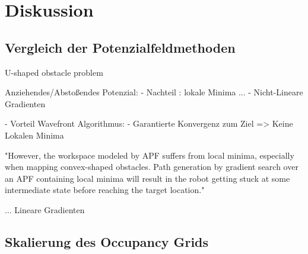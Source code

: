 \chapter{Diskussion}

\section{Vergleich der Potenzialfeldmethoden}

U-shaped obstacle problem \cite{yujiang.2017}

Anziehendes/Abstoßendes Potenzial:
	- Nachteil : lokale Minima
	...
	- Nicht-Lineare Gradienten


- Vorteil Wavefront Algorithmus: 
	- Garantierte Konvergenz zum Ziel => Keine Lokalen Minima

"However, the workspace modeled by APF suffers from local minima, especially when mapping convex-shaped obstacles. Path generation by gradient search over an APF containing local minima will result in the robot getting stuck at some intermediate state before reaching the target location." \cite{maqbool.2021}

	...
	Lineare Gradienten

\section{Skalierung des Occupancy Grids}